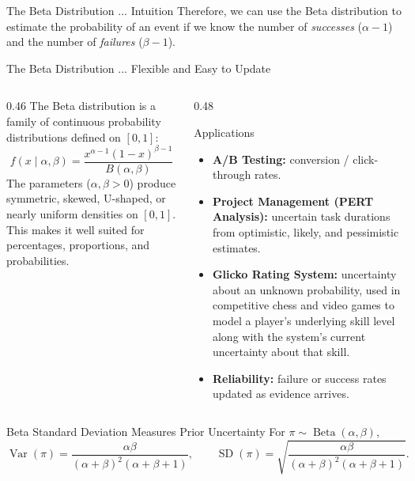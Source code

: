 \documentclass[aspectratio=43,11pt]{beamer}
\newcommand{\BetaDist}{\operatorname{Beta}}
\newcommand{\Var}{\operatorname{Var}}
\begin{document}
{\begin{frame}{The Beta Distribution ... Intuition}
      Therefore, we can use the Beta distribution to estimate the probability of an event if we know the number of {\it successes} ($\alpha-1$) and the number of {\it failures} ($\beta-1$).
    \end{frame}

    \begin{frame}{The Beta Distribution ... Flexible and Easy to Update}
      \footnotesize
      \begin{columns}[T,onlytextwidth]
        \begin{column}{0.46\textwidth}
          \vspace{1cm}
          The Beta distribution is a family of continuous probability distributions defined on $[0,1]$:
          \[
          f(x\mid\alpha,\beta)
          =\frac{x^{\alpha-1}(1-x)^{\beta-1}}
          {B(\alpha,\beta)}
          \]
          The parameters ($\alpha,\beta>0$) produce symmetric, skewed, U-shaped, or nearly uniform densities on $[0,1]$.
          This makes it well suited for percentages, proportions, and probabilities.
        \end{column}

        \begin{column}{0.48\textwidth}
          \begin{block}{Applications}
            \begin{itemize}
              \item \textbf{A/B Testing:} conversion / click-through rates.
              \item \textbf{Project Management (PERT Analysis):} uncertain task durations from optimistic, likely, and pessimistic estimates.
              \item \textbf{Glicko Rating System:} uncertainty about an unknown probability, used in competitive chess and video games to model a player's underlying skill level along with the system's current uncertainty about that skill.
              \item \textbf{Reliability:} failure or success rates updated as evidence arrives.
            \end{itemize}
          \end{block}
        \end{column}
      \end{columns}
    \end{frame}
  
  \begin{frame}{Beta Standard Deviation Measures Prior Uncertainty}
    For \(\pi\sim\BetaDist(\alpha,\beta)\),
    \[
      \Var(\pi)
      =\frac{\alpha\beta}
      {(\alpha+\beta)^2(\alpha+\beta+1)},
      \qquad
      \operatorname{SD}(\pi)
      =\sqrt{\frac{\alpha\beta}
      {(\alpha+\beta)^2(\alpha+\beta+1)}}.
    \]


\end{frame}}
\end{document}
